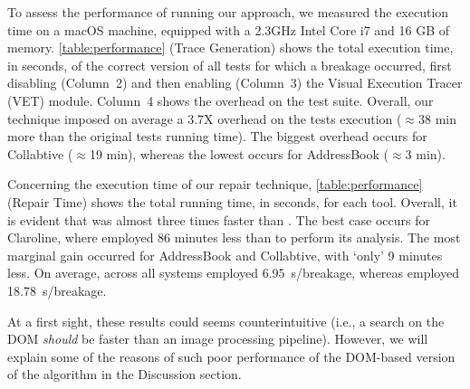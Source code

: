 \label{sec:performance}
To assess the performance of running our approach, we measured the execution time on a macOS machine, equipped with a 2.3GHz Intel Core i7 and 16 GB of memory.
\autoref{table:performance} (Trace Generation) shows the total execution time, in seconds, of the correct version of all tests for which a breakage occurred, first disabling (Column~2) and then enabling (Column~3) the Visual Execution Tracer (VET) module. Column~4 shows the overhead on the test suite.
Overall, our technique imposed on average a 3.7X overhead on the tests execution ($\approx$38 min more than the original tests running time). The biggest overhead occurs for Collabtive ($\approx$19 min), whereas the lowest occurs for AddressBook ($\approx$3 min). 

Concerning the execution time of our repair technique, \autoref{table:performance} (Repair Time) shows the total running time, in seconds, for each tool. Overall, it is evident that \tool was almost three times faster than \water. The best case occurs for Claroline, where \tool employed 86 minutes less than \water to perform its analysis. The most marginal gain occurred for AddressBook and Collabtive, with `only' 9 minutes less. 
On average, across all systems \tool employed 6.95~s/breakage, whereas \water employed 18.78~s/breakage.

At a first sight, these results could seems counterintuitive (i.e., a search on the DOM \textit{should} be faster than an image processing pipeline). However, we will explain some of the reasons of such poor performance of the DOM-based version of the algorithm in the Discussion section.







